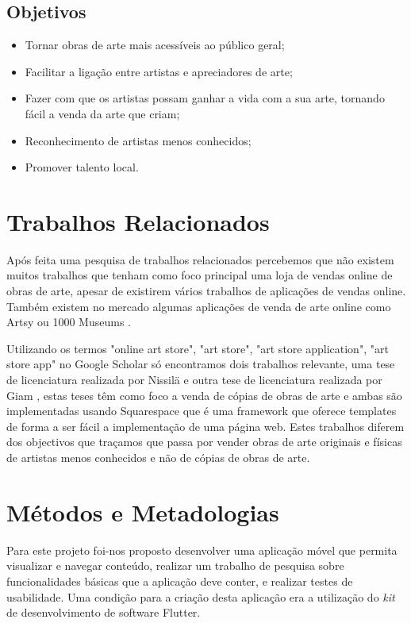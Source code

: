 \documentclass[conference]{IEEEtran}
\begin{document}
\subsection{Objetivos}
\begin{itemize}
    \item Tornar obras de arte mais acessíveis ao público geral;
    \item Facilitar a ligação entre artistas e apreciadores de arte;
    \item Fazer com que os artistas possam ganhar a vida com a sua arte, tornando fácil a venda da arte que criam;
    \item Reconhecimento de artistas menos conhecidos;
    \item Promover talento local.
\end{itemize}

\section{Trabalhos Relacionados}

Após feita uma pesquisa de trabalhos relacionados percebemos 
que não existem muitos trabalhos que tenham como foco 
principal uma loja de vendas online de obras de arte, apesar de existirem vários 
trabalhos de aplicações de vendas online. Também existem no mercado algumas 
aplicações de venda de arte online como Artsy \cite{artsy} ou 1000 Museums \cite{1000museums}.

Utilizando os termos "online art store", "art store", "art store application", 
"art store app" no Google Scholar só encontramos dois trabalhos relevante, uma tese 
de licenciatura realizada por Nissilä \cite{nissila2021creating} e outra 
tese de licenciatura realizada por Giam \cite{giam2017setting}, estas 
teses têm como foco a venda de cópias de obras de arte e ambas são 
implementadas usando Squarespace que é uma framework que oferece templates 
de forma a ser fácil a implementação de uma página web. 
Estes trabalhos diferem dos objectivos que traçamos que passa por vender 
obras de arte originais e físicas de artistas menos conhecidos e não de cópias 
de obras de arte.

\section{Métodos e Metadologias}

Para este projeto foi-nos proposto desenvolver uma aplicação móvel que 
permita visualizar e navegar conteúdo, realizar um trabalho de pesquisa 
sobre funcionalidades básicas que a aplicação deve conter, e realizar testes 
de usabilidade. Uma condição para a criação desta aplicação era a utilização 
do \textit{kit} de desenvolvimento de software Flutter.
\end{document}
